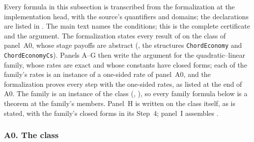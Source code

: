 Every formula in this subsection is transcribed from the formalization at
the implementation head, with the source's quantifiers and domains; the
declarations are listed in . The main text names
the conditions; this is the complete certificate and the argument. The
formalization states every result of  on the class of
panel~A0, whose stage payoffs are abstract (,
the structures \texttt{ChordEconomy} and \texttt{ChordEconomyCs}). Panels A--G
then write the argument for the quadratic--linear family, whose rates are exact
and whose constants have closed forms; each of the family's rates is an instance of
a one-sided rate of panel~A0, and the formalization proves every step with the
one-sided rates, as listed at the end of A0. The family is an instance of the
class (, ), so every family formula below is a
theorem at the family's members. Panel~H is written on the class itself, as
 is stated, with the family's closed forms in its
Step~4; panel~I assembles .

\subsubsection*{A0. The class}

